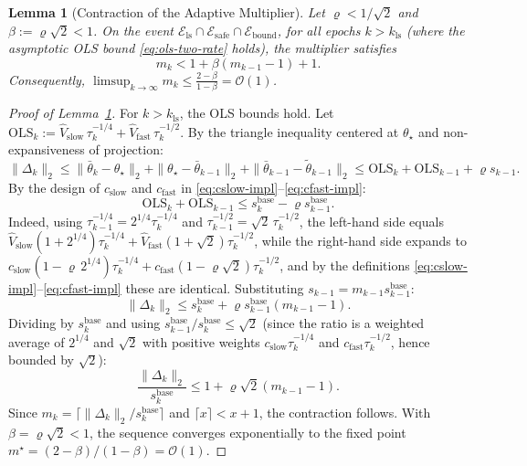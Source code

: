 \documentclass[10pt,a4paper]{amsart}
\newtheorem{lemma}{Lemma}
\newcommand{\Ebound}{\mathcal{E}_{\mathrm{bound}}}
\newcommand{\Els}{\mathcal{E}_{\mathrm{ls}}}
\newcommand{\Esafe}{\mathcal{E}_{\mathrm{safe}}}
\newcommand{\Vfasthat}{\widehat{V}_{\mathrm{fast}}}
\newcommand{\Vslowhat}{\widehat{V}_{\mathrm{slow}}}
\newcommand{\cfast}{c_{\mathrm{fast}}}
\newcommand{\cslow}{c_{\mathrm{slow}}}
\newcommand{\sbase}{s_k^{\mathrm{base}}}
\begin{document}
\begin{lemma}[Contraction of the Adaptive Multiplier]
    \label{lem:contraction}
    Let $\varrho < 1/\sqrt{2}$ and $\beta := \varrho\sqrt{2} < 1$. On the event $\Els \cap \Esafe \cap \Ebound$, for all epochs $k > k_{\mathrm{ls}}$ (where the asymptotic OLS bound \eqref{eq:ols-two-rate} holds), the multiplier satisfies
    \begin{equation}
        m_k < 1 + \beta(m_{k-1} - 1) + 1.
    \end{equation}
    Consequently, $\limsup_{k\to\infty} m_k \le \frac{2 - \beta}{1-\beta} = \mathcal{O}(1)$.
\end{lemma}

\begin{proof}[Proof of Lemma~\ref{lem:contraction}]
    For $k > k_{\mathrm{ls}}$, the OLS bounds hold. Let $\mathrm{OLS}_k := \Vslowhat\,\tau_k^{-1/4} + \Vfasthat\,\tau_k^{-1/2}$. By the triangle inequality centered at $\theta_\star$ and non-expansiveness of projection:
    \[
        \|\Delta_k\|_2 \le \|\bar\theta_k - \theta_\star\|_2 + \|\theta_\star - \bar\theta_{k-1}\|_2 + \|\bar\theta_{k-1} - \tilde\theta_{k-1}\|_2 \le \mathrm{OLS}_k + \mathrm{OLS}_{k-1} + \varrho s_{k-1}.
    \]
    By the design of $\cslow$ and $\cfast$ in \eqref{eq:cslow-impl}--\eqref{eq:cfast-impl}:
    \[
        \mathrm{OLS}_k + \mathrm{OLS}_{k-1} \le \sbase - \varrho s_{k-1}^{\mathrm{base}}.
    \]
    Indeed, using $\tau_{k-1}^{-1/4} = 2^{1/4}\tau_k^{-1/4}$ and $\tau_{k-1}^{-1/2} = \sqrt{2}\,\tau_k^{-1/2}$, the left-hand side equals $\Vslowhat(1+2^{1/4})\tau_k^{-1/4} + \Vfasthat(1+\sqrt{2})\tau_k^{-1/2}$, while the right-hand side expands to $\cslow(1-\varrho\,2^{1/4})\tau_k^{-1/4} + \cfast(1-\varrho\sqrt{2})\tau_k^{-1/2}$, and by the definitions \eqref{eq:cslow-impl}--\eqref{eq:cfast-impl} these are identical.
    Substituting $s_{k-1} = m_{k-1} s_{k-1}^{\mathrm{base}}$:
    \[
        \|\Delta_k\|_2 \le \sbase + \varrho s_{k-1}^{\mathrm{base}}(m_{k-1} - 1).
    \]
    Dividing by $\sbase$ and using $s_{k-1}^{\mathrm{base}}/\sbase \le \sqrt{2}$ (since the ratio is a weighted average of $2^{1/4}$ and $\sqrt{2}$ with positive weights $\cslow\tau_k^{-1/4}$ and $\cfast\tau_k^{-1/2}$, hence bounded by $\sqrt{2}$):
    \[
        \frac{\|\Delta_k\|_2}{\sbase} \le 1 + \varrho\sqrt{2}(m_{k-1}-1).
    \]
    Since $m_k = \lceil \|\Delta_k\|_2/\sbase \rceil$ and $\lceil x \rceil < x + 1$, the contraction follows. With $\beta = \varrho\sqrt{2} < 1$, the sequence converges exponentially to the fixed point $m^\star = (2-\beta)/(1-\beta) = \mathcal{O}(1)$.
\end{proof}
\end{document}

